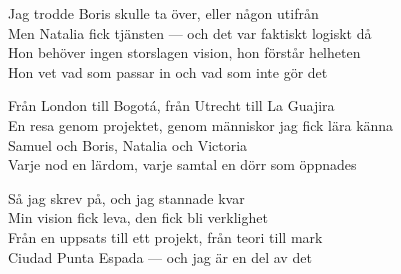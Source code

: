 \begin{lyrics}
Jag trodde Boris skulle ta över, eller någon utifrån\\
Men Natalia fick tjänsten — och det var faktiskt logiskt då\\
Hon behöver ingen storslagen vision, hon förstår helheten\\
Hon vet vad som passar in och vad som inte gör det

Från London till Bogotá, från Utrecht till La Guajira\\
En resa genom projektet, genom människor jag fick lära känna\\
Samuel och Boris, Natalia och Victoria\\
Varje nod en lärdom, varje samtal en dörr som öppnades

Så jag skrev på, och jag stannade kvar\\
Min vision fick leva, den fick bli verklighet\\
Från en uppsats till ett projekt, från teori till mark\\
Ciudad Punta Espada — och jag är en del av det
\end{lyrics}

